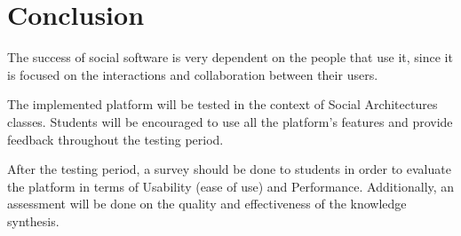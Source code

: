 
\chapter{Conclusion}
\label{chapter:conclusion}
\label{assessm}

The success of social software is very dependent on the people that use it, since it is focused on the interactions and collaboration between their users.

The implemented platform will be tested in the context of Social Architectures classes. Students will be encouraged to use all the platform's features and provide feedback throughout the testing period.

After the testing period, a survey should be done to students in order to evaluate the platform in terms of Usability (ease of use) and Performance. Additionally, an assessment will be done on the quality and effectiveness of the knowledge synthesis.
